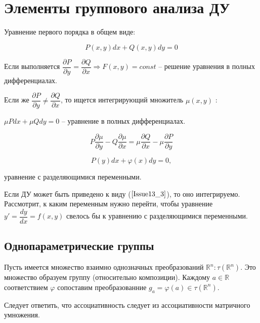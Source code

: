



\section{Элементы группового анализа ДУ}

Уравнение первого порядка в общем виде:

\begin{equation}
	P(x,y)dx + Q(x,y)dy = 0
	\label{Issue13_1}
\end{equation}

Если выполняется $\dfrac{\partial P}{\partial y} = \dfrac{\partial Q}{\partial x} \Rightarrow F(x,y) = const$ -- решение уравнения в полных дифференциалах.

Если же $\dfrac{\partial P}{\partial y} \neq \dfrac{\partial Q}{\partial x}$, то ищется интегрирующий множитель $\mu(x,y)$ :

$\mu Pdx + \mu Qdy = 0$ -- уравнение в полных дифференциалах.

\begin{equation}
	P\frac{\partial \mu}{\partial y} - Q \frac{\partial \mu}{\partial x} = \mu \dfrac{\partial Q}{\partial x} - \mu \dfrac{\partial P}{\partial y}
	\label{Issue13_2}
\end{equation}

\begin{equation}
	P(y)dx + \varphi(x)dy = 0,
	\label{Issue13_3}
\end{equation}

уравнение с разделяющимися переменными.

Если ДУ может быть приведено к виду ($\ref{Issue13_3}$), то оно интегрируемо. Рассмотрит, к каким переменным нужно перейти, чтобы уравнение $y' = \dfrac{dy}{dx} = f(x,y)$ свелось бы к уравнению с разделяющимися переменными.

\subsection{Однопараметрические группы}

Пусть имеется множество взаимно однозначных преобразований $\mathbb{R}^n: \tau(\mathbb{R}^n)$.
Это множество образуем группу (относительно композиции). Каждому $a \in \mathbb{R}$ соответствием $\varphi$ сопоставим преобразованние $g_a = \varphi(a) \in \tau(\mathbb{R}^n)$.

Следует ответить, что ассоциативность следует из ассоциативности матричного умножения.

